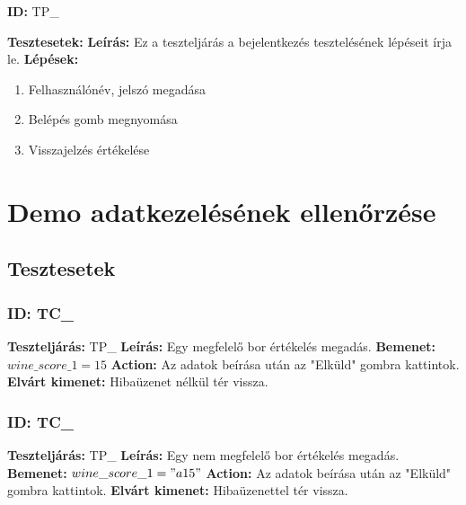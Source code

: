 \documentclass[12pt]{report}
\theoremstyle{definition}
\begin{document}
	\textbf{ID:}  TP\_\addtocounter{TP}{1}
	\newline
	\textbf{Tesztesetek:} 
	\newline
	\textbf{Leírás:} Ez a teszteljárás a bejelentkezés tesztelésének lépéseit írja le.
	\newline
	\textbf{Lépések:}
	\begin{enumerate}
		\item Felhasználónév, jelszó megadása
		\item Belépés gomb megnyomása
		\item Visszajelzés értékelése 
	\end{enumerate}
	
	
	
	
	\section{Demo adatkezelésének ellenőrzése}
	
	
	\subsection{Tesztesetek}
	\setcounter{TPTCStart}{\value{TC}}
	
	\subsubsection{ID: TC\_}\addtocounter{TC}{1}
	\textbf{Teszteljárás:} TP\_
	\newline 
	\textbf{Leírás:} Egy megfelelő bor értékelés megadás.
	\newline 
	\textbf{Bemenet:} $wine\_score\_1 = 15$
	\newline 
	\textbf{Action:} Az adatok beírása után az "Elküld" gombra kattintok.
	\newline 
	\textbf{Elvárt kimenet:} Hibaüzenet nélkül tér vissza.
	
	\subsubsection{ID: TC\_}\addtocounter{TC}{1}
	\textbf{Teszteljárás:} TP\_
	\newline 
	\textbf{Leírás:} Egy nem megfelelő bor értékelés megadás.
	\newline 
	\textbf{Bemenet:} $wine\_score\_1 = "a15"$
	\newline 
	\textbf{Action:} Az adatok beírása után az "Elküld" gombra kattintok.
	\newline 
	\textbf{Elvárt kimenet:} Hibaüzenettel tér vissza.
	
\end{document}
